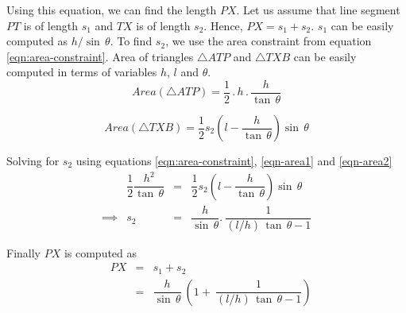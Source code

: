 \documentclass[conf]{new-aiaa}
\begin{document}
Using this equation, we can find the length $\mathit{PX}$. Let us assume that line segment $\mathit{PT}$ is of length $s_1$ and $\mathit{TX}$ is of length $s_2$. Hence, $\mathit{PX = s_1 + s_2}$. $s_1$ can be easily computed as $h/\sin \, \theta$. To find $s_2$, we use the area constraint from equation \ref{eqn:area-constraint}. Area of triangles $\mathit{\bigtriangleup ATP}$ and $\mathit{\bigtriangleup TXB}$ can be easily computed in terms of variables $h$, $l$ and $\theta$.
\begin{equation}
    Area(\mathit{\bigtriangleup ATP}) = \dfrac{1}{2} \, . \,  h \, .  \, \dfrac{h}{\tan \, \theta}
    \label{eqn-area1}
\end{equation}

\begin{equation}
    Area(\mathit{\bigtriangleup TXB}) = \dfrac{1}{2} s_2 \left(l - \dfrac{h}{\tan \, \theta}\right) \sin \, \theta
    \label{eqn-area2}    
\end{equation}

Solving for $s_2$ using equations \ref{eqn:area-constraint}, \ref{eqn-area1} and \ref{eqn-area2}
\begin{equation}
\begin{array}{llcl}
     & \dfrac{1}{2} \dfrac{h^2}{\tan \, \theta}  & = & \dfrac{1}{2} s_2 \left(l - \dfrac{h}{\tan \, \theta} \right) \sin \, \theta  \\
    \implies & s_2& = & \dfrac{h}{\sin \, \theta} . \: \dfrac{1}{ (l/h)\, \tan \, \theta - 1}
\end{array}
\end{equation}


Finally $\mathit{PX}$ is computed as
\begin{equation}
\begin{array}{llcl}
     &  \mathit{PX} & = & s_1 + s_2 \\
    & & = & \dfrac{h}{\sin \, \theta} \:  \left( 1 +  \: \dfrac{1}{ (l/h)\, \tan \, \theta - 1} \right)\\
\end{array}
\end{equation}
\end{document}
